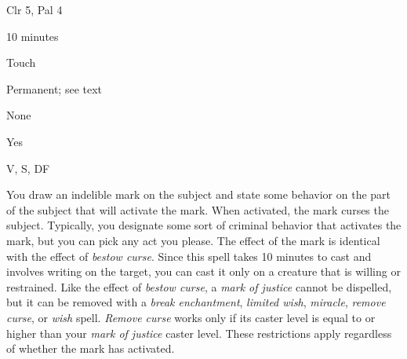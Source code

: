 
\begin{description*}
\item[Level:] Clr 5, Pal 4
\item[Casting Time:] 10 minutes
\item[Range:] Touch
\item[Duration:] Permanent; see text
\item[Saving Throw:] None
\item[Spell Resistance:] Yes
\item[Components:] V, S, DF
\end{description*}

You draw an indelible mark on the subject and state some behavior on the part of
the subject that will activate the mark. When activated, the mark curses the subject.
Typically, you designate some sort of criminal behavior that activates the mark,
but you can pick any act you please. The effect of the mark is identical with the
effect of \textit{bestow curse}.
Since this spell takes 10 minutes to cast and involves writing on the target, you
can cast it only on a creature that is willing or restrained.
Like the effect of \textit{bestow curse}, a \textit{mark of justice} cannot be
dispelled, but it can be removed with a \textit{break enchantment}, \textit{limited
wish}, \textit{miracle}, \textit{remove curse}, or \textit{wish} spell. \textit{Remove
curse} works only if its caster level is equal to or higher than your \textit{mark
of justice} caster level. These restrictions apply regardless of whether the mark
has activated.